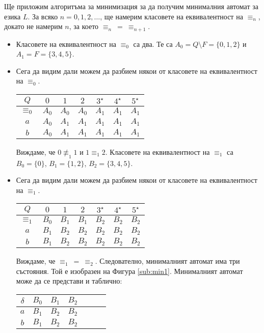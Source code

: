 \begin{example}
Ще приложим алгоритъма за минимизация за да получим минималния автомат за езика $L$.
За всяко $n = 0,1,2,\dots$, ще намерим класовете на еквивалентност на $\equiv_n$,
докато не намерим $n$, за което $\equiv_n\ =\ \equiv_{n+1}$.

\begin{itemize}
\item 
  Класовете на еквивалентност на $\equiv_0$ са два.
  Те са $A_0 = Q\setminus F = \{0,1,2\}$ и $A_1 = F = \{3,4,5\}$.
\item
  Сега да видим дали можем да разбием някои от класовете на еквивалентност на $\equiv_0$.
  
  \begin{tabular}{|c|c|c|c|c|c|c|}
    \hline
    $Q$ & $0$ & $1$ & $2$ & $3^\star$ & $4^\star$ & $5^\star$ \\
    \hline
    \hline
    $\equiv_0$ & $A_0$ & $A_0$ & $A_0$ & $A_1$ & $A_1$ & $A_1$\\
    \hline
    $a$ & $A_0$& $A_1$ & $A_1$ & $A_1$ & $A_1$ & $A_1$\\
    \hline
    $b$ & $A_0$& $A_1$ & $A_1$ & $A_1$ & $A_1$ & $A_1$\\
    \hline
  \end{tabular}

  Виждаме, че $0 \not\equiv_1 1$ и $1 \equiv_1 2$.
  Класовете на еквивалентност на $\equiv_1$ са 
  $B_0 = \{0\}$, $B_1 = \{1,2\}$, $B_2 = \{3,4,5\}$.
\item
  Сега да видим дали можем да разбием някои от класовете на еквивалентност на $\equiv_1$.
  
  \begin{tabular}{|c|c|c|c|c|c|c|}
    \hline
    $Q$ & $0$ & $1$ & $2$ & $3^\star$ & $4^\star$ & $5^\star$ \\
    \hline
    \hline
    $\equiv_1$ & $B_0$ & $B_1$ & $B_1$ & $B_2$ & $B_2$ & $B_2$\\
    \hline
    $a$ & $B_1$ & $B_2$ & $B_2$ & $B_2$ & $B_2$ & $B_2$\\
    \hline
    $b$ & $B_1$ & $B_2$ & $B_2$ & $B_2$ & $B_2$ & $B_2$\\
    \hline
  \end{tabular}

  Виждаме, че $\equiv_1\ =\ \equiv_2$.
  Следователно, минималният автомат има три състояния.
  Той е изобразен на Фигура \ref{sub:min1}.  
  Минималният автомат може да се представи и таблично:
  
  \begin{tabular}{|c|c|c|c|c|c|c|}
    \hline
    $\delta$ & $B_0$ & $B_1$ & $B_2$ \\
    \hline
    $a$ & $B_1$ & $B_2$ & $B_2$ \\
    \hline
    $b$ & $B_1$ & $B_2$ & $B_2$ \\
    \hline
  \end{tabular}
\end{itemize}
\end{example}

